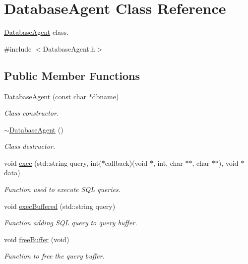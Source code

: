 \hypertarget{class_database_agent}{}\section{Database\+Agent Class Reference}
\label{class_database_agent}


\hyperlink{class_database_agent}{Database\+Agent} class.  




{\ttfamily \#include $<$Database\+Agent.\+h$>$}

\subsection*{Public Member Functions}
\begin{DoxyCompactItemize}
\item 
\hyperlink{class_database_agent_af00e78928fe3bd97115d1123ed08d91c}{Database\+Agent} (const char $\ast$dbname)
\begin{DoxyCompactList}\small\item\em Class constructor. \end{DoxyCompactList}\item 
\hyperlink{class_database_agent_a6e201bdcbb3fd95df24d244bf101143e}{$\sim$\+Database\+Agent} ()\hypertarget{class_database_agent_a6e201bdcbb3fd95df24d244bf101143e}{}\label{class_database_agent_a6e201bdcbb3fd95df24d244bf101143e}

\begin{DoxyCompactList}\small\item\em Class destructor. \end{DoxyCompactList}\item 
void \hyperlink{class_database_agent_a21af2767f8078302a28c0e01f317e042}{exec} (std\+::string query, int($\ast$callback)(void $\ast$, int, char $\ast$$\ast$, char $\ast$$\ast$), void $\ast$data)
\begin{DoxyCompactList}\small\item\em Function used to execute S\+QL queries. \end{DoxyCompactList}\item 
void \hyperlink{class_database_agent_a947629f03edce06965a18e3a3726ade1}{exec\+Buffered} (std\+::string query)
\begin{DoxyCompactList}\small\item\em Function adding S\+QL query to query buffer. \end{DoxyCompactList}\item 
void \hyperlink{class_database_agent_a0df6a03010d2bbf11852577de324aa67}{free\+Buffer} (void)
\begin{DoxyCompactList}\small\item\em Function to free the query buffer. \end{DoxyCompactList}\end{DoxyCompactItemize}


